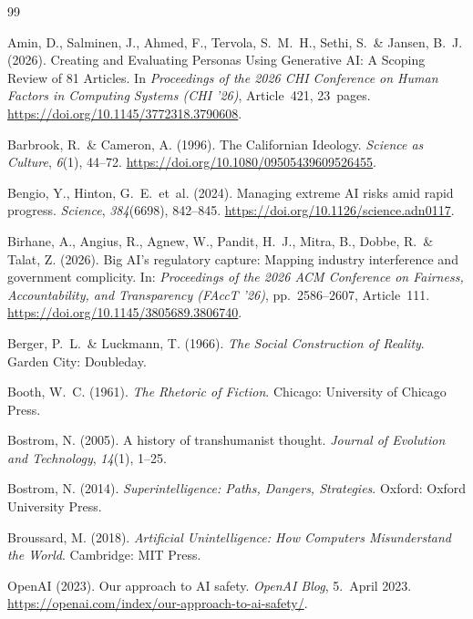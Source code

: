 \documentclass[12pt,a4paper]{article}
\begin{document}
\begin{thebibliography}{99}

  Amin, D., Salminen, J., Ahmed, F., Tervola, S.~M.~H., Sethi, S.~\& Jansen, B.~J. (2026).
  Creating and Evaluating Personas Using Generative AI: A Scoping Review of 81 Articles.
  In \textit{Proceedings of the 2026 CHI Conference on Human Factors in Computing Systems (CHI '26)}, Article~421, 23~pages.
  \url{https://doi.org/10.1145/3772318.3790608}.

  Barbrook, R.~\& Cameron, A. (1996).
  The Californian Ideology.
  \textit{Science as Culture}, \textit{6}(1), 44--72.
  \url{https://doi.org/10.1080/09505439609526455}.

  Bengio, Y., Hinton, G.~E.~et~al. (2024).
  Managing extreme AI risks amid rapid progress.
  \textit{Science}, \textit{384}(6698), 842--845.
  \url{https://doi.org/10.1126/science.adn0117}.

  Birhane, A., Angius, R., Agnew, W., Pandit, H.~J., Mitra, B., Dobbe, R.~\& Talat, Z. (2026).
  Big AI's regulatory capture: Mapping industry interference and government complicity.
  In: \textit{Proceedings of the 2026 ACM Conference on Fairness, Accountability, and Transparency (FAccT '26)}, pp.~2586--2607, Article~111.
  \url{https://doi.org/10.1145/3805689.3806740}.

  Berger, P.~L.~\& Luckmann, T. (1966).
  \textit{The Social Construction of Reality}.
  Garden City: Doubleday.

  Booth, W.~C. (1961).
  \textit{The Rhetoric of Fiction}.
  Chicago: University of Chicago Press.

  Bostrom, N. (2005).
  A history of transhumanist thought.
  \textit{Journal of Evolution and Technology}, \textit{14}(1), 1--25.

  Bostrom, N. (2014).
  \textit{Superintelligence: Paths, Dangers, Strategies}.
  Oxford: Oxford University Press.

  Broussard, M. (2018).
  \textit{Artificial Unintelligence: How Computers Misunderstand the World}.
  Cambridge: MIT Press.

  OpenAI (2023).
  Our approach to AI safety.
  \textit{OpenAI Blog}, 5.~April 2023.
  \url{https://openai.com/index/our-approach-to-ai-safety/}.


\end{thebibliography}
\end{document}
